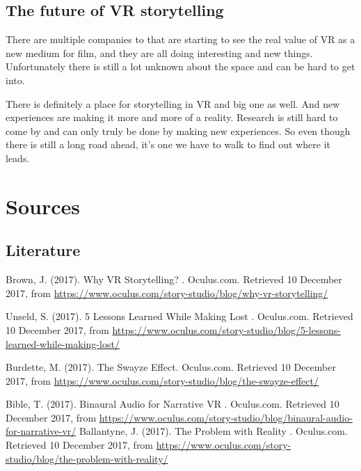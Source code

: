 \documentclass{report}
\begin{document}
				
				\section{The future of VR storytelling}
				
				There are multiple companies to that are starting to see the real value of VR as a new medium for film, and they are all doing interesting and new things. Unfortunately there is still a lot unknown about the space and can be hard to get into.
				 				
				There is definitely a place for storytelling in VR and big one as well. And new experiences are making it more and more of a reality. Research is still hard to come by and can only truly be done by making new experiences. So even though there is still a long road ahead, it's one we have to walk to find out where it leads.
				
				\chapter{Sources}
				
							
				\section{Literature}
				
				Brown, J. (2017). Why VR Storytelling? . Oculus.com. Retrieved 10 December 2017, from \href{https://www.oculus.com/story-studio/blog/why-vr-storytelling/}{https://www.oculus.com/story-studio/blog/why-vr-storytelling/}
				
				Unseld, S. (2017). 5 Lessons Learned While Making Lost . Oculus.com. Retrieved 10 December 2017, from \href{https://www.oculus.com/story-studio/blog/5-lessons-learned-while-making-lost/}{https://www.oculus.com/story-studio/blog/5-lessons-learned-while-making-lost/}
				
				Burdette, M. (2017). The Swayze Effect. Oculus.com. Retrieved 10 December 2017, from \href{https://www.oculus.com/story-studio/blog/the-swayze-effect/}{https://www.oculus.com/story-studio/blog/the-swayze-effect/}
				
				Bible, T. (2017). Binaural Audio for Narrative VR . Oculus.com. Retrieved 10 December 2017, from \href{https://www.oculus.com/story-studio/blog/binaural-audio-for-narrative-vr/}{https://www.oculus.com/story-studio/blog/binaural-audio-for-narrative-vr/}				
				Ballantyne, J. (2017). The Problem with Reality . Oculus.com. Retrieved 10 December 2017, from \href{https://www.oculus.com/story-studio/blog/the-problem-with-reality/}{https://www.oculus.com/story-studio/blog/the-problem-with-reality/}
				
\end{document}
